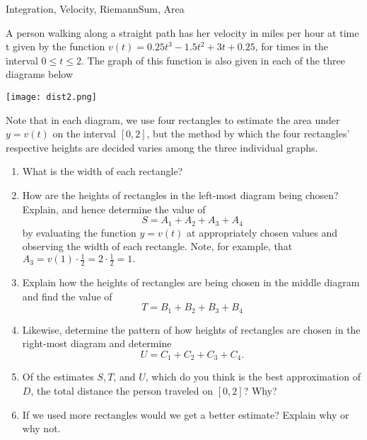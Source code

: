 \begin{tagblock}{Integration, Velocity, RiemannSum, Area}
\begin{question}

A person walking along a straight path has her velocity in miles per hour at time t given by the function $v(t)=0.25t^3-1.5t^2+3t+0.25$, for times in the interval $0\leq t \leq 2$. The graph of this function is also given in each of the three diagrams below

\hspace{1.25in}\texttt{[image: dist2.png]}

Note that in each diagram, we use four rectangles to estimate the area under $y=v(t)$ on the interval $[0,2]$, but the method by which the four rectangles' respective heights are decided varies among the three individual graphs. 
\begin{enumerate}
\item What is the width of each rectangle?
\vspace{.5in}

\item How are the heights of rectangles in the left-most diagram being chosen? Explain, and hence determine the value of
\[S=A_1 + A_2 + A_3 + A_4\]
by evaluating the function $y=v(t)$  at appropriately chosen values and observing the width of each rectangle. Note, for example, that
$A_3=v(1)\cdot\frac{1}{2}=2\cdot\frac{1}{2}=1.$

\vspace{1.5in}
\item Explain how the heights of rectangles are being chosen in the middle diagram and find the value of
\[T=B_1 + B_2 + B_3 + B_4\]

\vspace{1in}
\item Likewise, determine the pattern of how heights of rectangles are chosen in the right-most diagram and determine
\[U=C_1+C_2+C_3+C_4.\]

\vspace{1.7in}

\item Of the estimates $S,T$, and $U$, which do you think is the best approximation of $D$, the total distance the person traveled on $[0,2]$? Why?

\vspace{1in}
\item If we used more rectangles would we get a better estimate?  Explain why or why not.  


\end{enumerate}
\end{question}
\end{tagblock}
